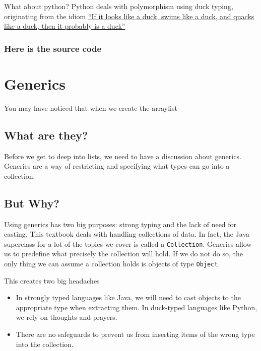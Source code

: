 What about python?  Python deals with polymorphism using duck typing, originating from the idiom  \href{https://en.wikipedia.org/wiki/Duck\_test}{``If it looks like a duck, swims like a duck, and quacks like a duck, then it probably is a duck''}
\subsubsection*{Here is the source code}



\section{Generics}

You may have noticed that when we create the arraylist

\subsection{What are they?}


Before we get to deep into lists, we need to have a discussion about generics. Generics are a way of restricting and specifying what types can go into a collection.

\subsection{But Why?}


Using generics has two big purposes: strong typing and the lack of need for casting.  This textbook deals with handling collections of data.   In fact, the Java superclass for a lot of the topics we cover is called a \texttt{Collection}.  Generics allow us to predefine what precisely the collection will hold.  If we do not do so, the only thing we can assume a collection holds is objects of type \texttt{Object}.

This creates two big headaches
\begin{itemize}
	
	\item In strongly typed languages like Java, we will need to cast  objects to the appropriate type when extracting them.  In duck-typed languages like Python, we rely on thoughts and prayers.
	\item There are no safeguards to prevent us from inserting items of the wrong type into the collection.
\end{itemize}


